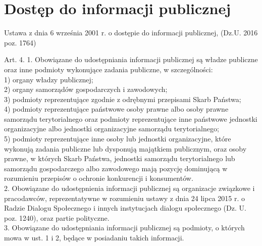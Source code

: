 \section{Dostęp do informacji publicznej}

Ustawa z dnia 6 września 2001 r. o dostępie do informacji publicznej, (Dz.U. 2016 poz. 1764)

\begin{prawne}
Art. 4. 1. Obowiązane do udostępniania informacji publicznej są władze publiczne oraz inne podmioty wykonujące zadania publiczne, w szczególności:
\\1) organy władzy publicznej;
\\2) organy samorządów gospodarczych i zawodowych;
\\3) podmioty reprezentujące zgodnie z odrębnymi przepisami Skarb Państwa;
\\4) podmioty reprezentujące państwowe osoby prawne albo osoby prawne samorządu terytorialnego oraz podmioty reprezentujące inne państwowe jednostki organizacyjne albo jednostki organizacyjne samorządu terytorialnego;
\\5) podmioty reprezentujące inne osoby lub jednostki organizacyjne, które wykonują zadania publiczne lub dysponują majątkiem publicznym, oraz osoby prawne, w których Skarb Państwa, jednostki samorządu terytorialnego lub samorządu gospodarczego albo zawodowego mają pozycję dominującą w rozumieniu przepisów o ochronie konkurencji i konsumentów.
\\2. Obowiązane do udostępnienia informacji publicznej są organizacje związkowe i pracodawców, reprezentatywne w rozumieniu ustawy z dnia 24 lipca 2015 r. o Radzie Dialogu Społecznego i innych instytucjach dialogu społecznego (Dz. U. poz. 1240), oraz partie polityczne.
\\3. Obowiązane do udostępniania informacji publicznej są podmioty, o których mowa w ust. 1 i 2, będące w posiadaniu takich informacji.	 
\end{prawne}

